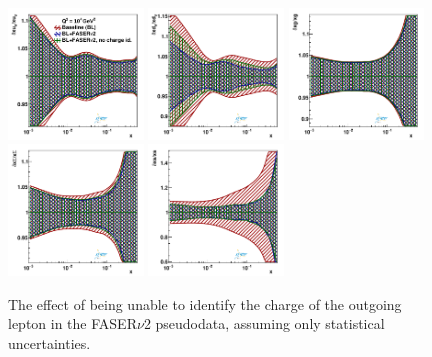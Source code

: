 \begin{figure}[t]
\centering
\includegraphics[width=0.32\textwidth]{plots/nuclear_fasernu2/nochargediscrimination/statOnly_FASERv2_q2_10000_pdf_uv_ratio.pdf}
\includegraphics[width=0.32\textwidth]{plots/nuclear_fasernu2/nochargediscrimination/statOnly_FASERv2_q2_10000_pdf_dv_ratio.pdf}
\includegraphics[width=0.32\textwidth]{plots/nuclear_fasernu2/nochargediscrimination/statOnly_FASERv2_q2_10000_pdf_g_ratio.pdf}\\
\includegraphics[width=0.32\textwidth]{plots/nuclear_fasernu2/nochargediscrimination/statOnly_FASERv2_q2_10000_pdf_Sea_ratio.pdf}
\includegraphics[width=0.32\textwidth]{plots/nuclear_fasernu2/nochargediscrimination/statOnly_FASERv2_q2_10000_pdf_s_ratio.pdf}
\caption{The effect of being unable to identify the charge of the outgoing lepton in the FASER$\nu$2 pseudodata, assuming only statistical uncertainties.
}
\label{fig:profiling_nochargediscrimination_nuclear}
\end{figure}


